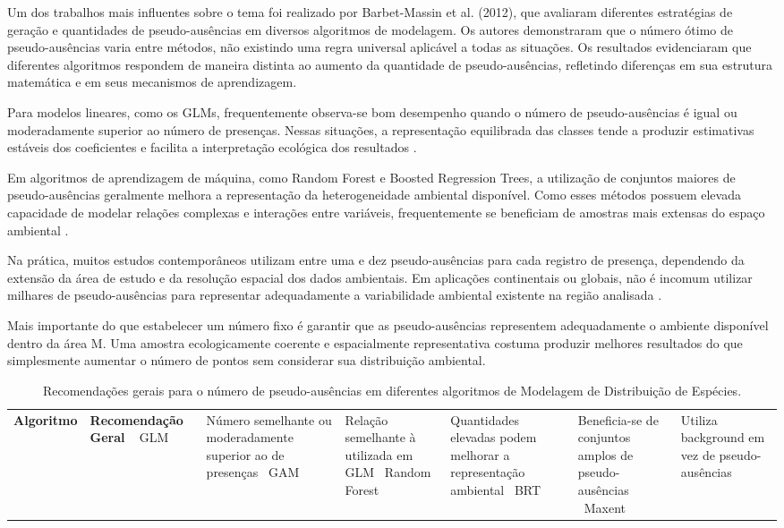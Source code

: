 Um dos trabalhos mais influentes sobre o tema foi realizado por Barbet-Massin et al. (2012), que avaliaram diferentes estratégias de geração e quantidades de pseudo-ausências em diversos algoritmos de modelagem. Os autores demonstraram que o número ótimo de pseudo-ausências varia entre métodos, não existindo uma regra universal aplicável a todas as situações. Os resultados evidenciaram que diferentes algoritmos respondem de maneira distinta ao aumento da quantidade de pseudo-ausências, refletindo diferenças em sua estrutura matemática e em seus mecanismos de aprendizagem.

Para modelos lineares, como os GLMs, frequentemente observa-se bom desempenho quando o número de pseudo-ausências é igual ou moderadamente superior ao número de presenças. Nessas situações, a representação equilibrada das classes tende a produzir estimativas estáveis dos coeficientes e facilita a interpretação ecológica dos resultados \citep{barbet2012selecting}.

Em algoritmos de aprendizagem de máquina, como Random Forest e Boosted Regression Trees, a utilização de conjuntos maiores de pseudo-ausências geralmente melhora a representação da heterogeneidade ambiental disponível. Como esses métodos possuem elevada capacidade de modelar relações complexas e interações entre variáveis, frequentemente se beneficiam de amostras mais extensas do espaço ambiental \citep{elith2008working}.

Na prática, muitos estudos contemporâneos utilizam entre uma e dez pseudo-ausências para cada registro de presença, dependendo da extensão da área de estudo e da resolução espacial dos dados ambientais. Em aplicações continentais ou globais, não é incomum utilizar milhares de pseudo-ausências para representar adequadamente a variabilidade ambiental existente na região analisada \citep{guisan2017habitat}.

Mais importante do que estabelecer um número fixo é garantir que as pseudo-ausências representem adequadamente o ambiente disponível dentro da área M. Uma amostra ecologicamente coerente e espacialmente representativa costuma produzir melhores resultados do que simplesmente aumentar o número de pontos sem considerar sua distribuição ambiental.

\begin{table}[H]
	\centering
	\caption{Recomendações gerais para o número de pseudo-ausências em diferentes algoritmos de Modelagem de Distribuição de Espécies.}
	\label{tab:numero_pseudoausencias}
	\begin{tabular}{p{4cm}p{7cm}}
		\toprule
		\textbf{Algoritmo} & \textbf{Recomendação Geral} \
		\midrule
		GLM & Número semelhante ou moderadamente superior ao de presenças \
		GAM & Relação semelhante à utilizada em GLM \
		Random Forest & Quantidades elevadas podem melhorar a representação ambiental \
		BRT & Beneficia-se de conjuntos amplos de pseudo-ausências \
		Maxent & Utiliza background em vez de pseudo-ausências \
		\bottomrule
	\end{tabular}
\end{table}

